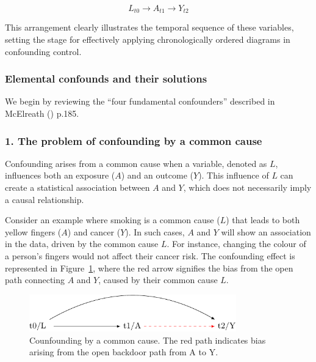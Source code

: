 \documentclass[
  singlecolumn,
  9pt]{article}
\begin{document}
\[L_{t0} \to A_{t1} \to Y_{t2}\]

This arrangement clearly illustrates the temporal sequence of these
variables, setting the stage for effectively applying chronologically
ordered diagrams in confounding control.

\subsubsection{Elemental confounds and their
solutions}\label{elemental-confounds-and-their-solutions}

We begin by reviewing the ``four fundamental confounders'' described in
McElreath () p.185.

\subsubsection{1. The problem of confounding by a common
cause}\label{the-problem-of-confounding-by-a-common-cause}

Confounding arises from a common cause when a variable, denoted as
\(L\), influences both an exposure (\(A\)) and an outcome (\(Y\)). This
influence of \(L\) can create a statistical association between \(A\)
and \(Y\), which does not necessarily imply a causal relationship.

Consider an example where smoking is a common cause (\(L\)) that leads
to both yellow fingers (\(A\)) and cancer (\(Y\)). In such cases, \(A\)
and \(Y\) will show an association in the data, driven by the common
cause \(L\). For instance, changing the colour of a person's fingers
would not affect their cancer risk. The confounding effect is
represented in Figure~\ref{fig-dag-common-cause}, where the red arrow
signifies the bias from the open path connecting \(A\) and \(Y\), caused
by their common cause \(L\).

\begin{figure}

{\centering \includegraphics[width=0.8\textwidth,height=\textheight]{causal-dags_files/figure-pdf/fig-dag-common-cause-1.pdf}

}

\caption{\label{fig-dag-common-cause}Counfounding by a common cause. The
red path indicates bias arising from the open backdoor path from A to
Y.}

\end{figure}
\end{document}

